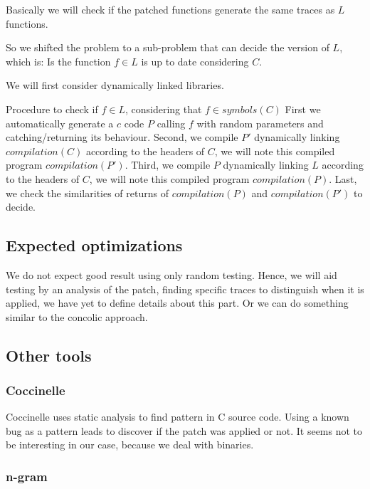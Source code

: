 \documentclass{article}
\newcommand{\symb}{{symbols}}
\newcommand{\comp}{{compilation}}
\begin{document}
    Basically we will check if the patched functions generate the same traces
    as $L$ functions.


    So we shifted the problem to a sub-problem that can decide the version of
    $L$, which is: Is the function $f \in L$ is up to date considering $C$.

    We will first consider dynamically linked libraries.

    Procedure to check if $f \in L$, considering that $f \in \symb(C)$
    First we automatically generate a $c$ code $P$ calling $f$ with random
    parameters and catching/returning its behaviour. 
    Second, we compile $P'$ dynamically linking $\comp(C)$ according to the
    headers of $C$, we will note this compiled program $\comp(P')$. 
    Third, we compile $P$ dynamically linking $L$ according to the headers of
    $C$, we will note this compiled program $\comp(P)$. 
    Last, we check the similarities of returns of $\comp(P)$ and $\comp(P')$
    to decide.

    \subsection{Expected optimizations}
    We do not expect good result using only random testing. Hence, we will aid
    testing by an analysis of the patch, finding specific traces to
    distinguish when it is applied, we have yet to define details about this
    part. 
    Or we can do something similar to the concolic approach.
    
    
    \subsection{Other tools}

		\subsubsection{Coccinelle} 
			Coccinelle uses static analysis to find pattern in C source code. Using a known bug as a pattern leads to discover if the patch was applied or not. It seems not to be interesting in our case, because we deal with binaries.
		\subsubsection{n-gram}
\end{document}
